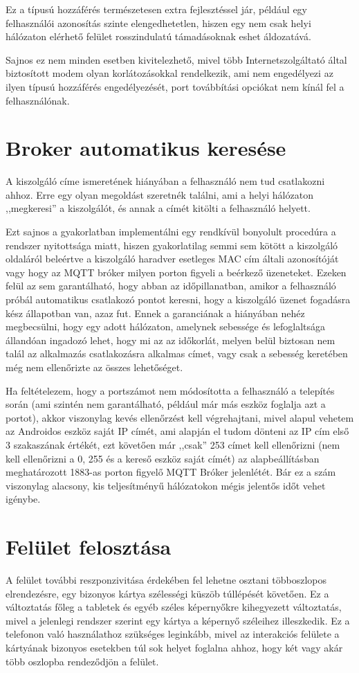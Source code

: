 \documentclass[
]{thesis-ekf}
\theoremstyle{definition}
\theoremstyle{remark}
\begin{document}
Ez a típusú hozzáférés természetesen extra fejlesztéssel jár, például egy felhasználói azonosítás
szinte elengedhetetlen, hiszen egy nem csak helyi hálózaton elérhető felület rosszindulatú támadásoknak
eshet áldozatává.

Sajnos ez nem minden esetben kivitelezhető, mivel több Internetszolgáltató által biztosított modem
olyan korlátozásokkal rendelkezik, ami nem engedélyezi az ilyen típusú hozzáférés engedélyezését,
port továbbítási opciókat nem kínál fel a felhasználónak.

\section{Broker automatikus keresése}
A kiszolgáló címe ismeretének hiányában a felhasználó nem tud csatlakozni ahhoz. Erre egy olyan megoldást
szeretnék találni, ami a helyi hálózaton ,,megkeresi'' a kiszolgálót, és annak a címét kitölti a felhasználó helyett.

Ezt sajnos a gyakorlatban implementálni egy rendkívül bonyolult procedúra a rendszer nyitottsága miatt, hiszen
gyakorlatilag semmi sem kötött a kiszolgáló oldaláról beleértve a kiszolgáló haradver esetleges MAC cím általi
azonosítóját vagy hogy az MQTT bróker milyen porton figyeli a beérkező üzeneteket. Ezeken felül az sem garantálható,
hogy abban az időpillanatban, amikor a felhasználó próbál automatikus csatlakozó pontot keresni, hogy a kiszolgáló
üzenet fogadásra kész állapotban van, azaz fut. Ennek a garanciának a hiányában nehéz megbecsülni, hogy
egy adott hálózaton, amelynek sebessége és lefoglaltsága állandóan ingadozó lehet, hogy mi az az időkorlát,
melyen belül biztosan nem talál az alkalmazás csatlakozásra alkalmas címet, vagy csak a sebesség keretében
még nem ellenőrizte az összes lehetőséget.

Ha feltételezem, hogy a portszámot nem módosította a felhasználó a telepítés során (ami szintén nem garantálható,
például már más eszköz foglalja azt a portot), akkor viszonylag kevés ellenőrzést kell végrehajtani, mivel alapul
vehetem az Androidos eszköz saját IP címét, ami alapján el tudom dönteni az IP cím első 3 szakaszának értékét,
ezt követően már ,,csak'' 253 címet kell ellenőrizni (nem kell ellenőrizni a 0, 255 és a kereső eszköz saját címét)
az alapbeállításban meghatározott 1883-as porton figyelő MQTT Bróker jelenlétét.
Bár ez a szám viszonylag alacsony, kis teljesítményű hálózatokon mégis jelentős időt vehet igénybe.

\section{Felület felosztása}
A felület további reszponzivitása érdekében fel lehetne osztani többoszlopos elrendezésre, egy bizonyos
kártya szélességi küszöb túllépését követően. Ez a változtatás főleg a tabletek és egyéb széles képernyőkre
kihegyezett változtatás, mivel a jelenlegi rendszer szerint egy kártya a képernyő széleihez illeszkedik.
Ez a telefonon való használathoz szükséges leginkább, mivel az interakciós felülete a kártyának bizonyos
esetekben túl sok helyet foglalna ahhoz, hogy két vagy akár több oszlopba rendeződjön a felület.
\end{document}
